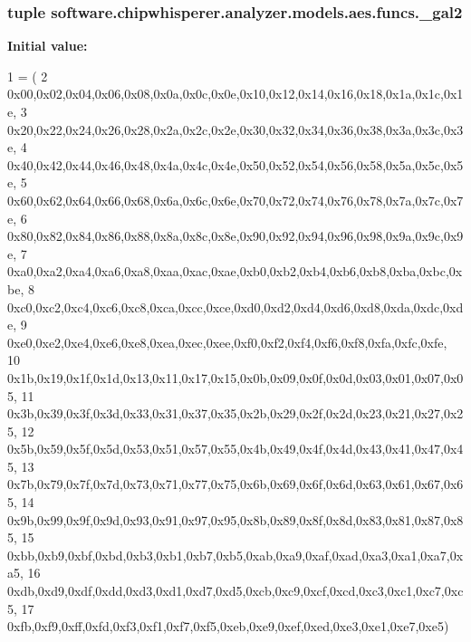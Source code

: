 \subsubsection[{\+\_\+gal2}]{\setlength{\rightskip}{0pt plus 5cm}tuple software.\+chipwhisperer.\+analyzer.\+models.\+aes.\+funcs.\+\_\+gal2}\label{namespacesoftware_1_1chipwhisperer_1_1analyzer_1_1models_1_1aes_1_1funcs_a72cff0a386d50150812d3de64c5efa8b}
{\bfseries Initial value\+:}
\begin{DoxyCode}
1 = (
2 0x00,0x02,0x04,0x06,0x08,0x0a,0x0c,0x0e,0x10,0x12,0x14,0x16,0x18,0x1a,0x1c,0x1e,
3 0x20,0x22,0x24,0x26,0x28,0x2a,0x2c,0x2e,0x30,0x32,0x34,0x36,0x38,0x3a,0x3c,0x3e,
4 0x40,0x42,0x44,0x46,0x48,0x4a,0x4c,0x4e,0x50,0x52,0x54,0x56,0x58,0x5a,0x5c,0x5e,
5 0x60,0x62,0x64,0x66,0x68,0x6a,0x6c,0x6e,0x70,0x72,0x74,0x76,0x78,0x7a,0x7c,0x7e,
6 0x80,0x82,0x84,0x86,0x88,0x8a,0x8c,0x8e,0x90,0x92,0x94,0x96,0x98,0x9a,0x9c,0x9e,
7 0xa0,0xa2,0xa4,0xa6,0xa8,0xaa,0xac,0xae,0xb0,0xb2,0xb4,0xb6,0xb8,0xba,0xbc,0xbe,
8 0xc0,0xc2,0xc4,0xc6,0xc8,0xca,0xcc,0xce,0xd0,0xd2,0xd4,0xd6,0xd8,0xda,0xdc,0xde,
9 0xe0,0xe2,0xe4,0xe6,0xe8,0xea,0xec,0xee,0xf0,0xf2,0xf4,0xf6,0xf8,0xfa,0xfc,0xfe,
10 0x1b,0x19,0x1f,0x1d,0x13,0x11,0x17,0x15,0x0b,0x09,0x0f,0x0d,0x03,0x01,0x07,0x05,
11 0x3b,0x39,0x3f,0x3d,0x33,0x31,0x37,0x35,0x2b,0x29,0x2f,0x2d,0x23,0x21,0x27,0x25,
12 0x5b,0x59,0x5f,0x5d,0x53,0x51,0x57,0x55,0x4b,0x49,0x4f,0x4d,0x43,0x41,0x47,0x45,
13 0x7b,0x79,0x7f,0x7d,0x73,0x71,0x77,0x75,0x6b,0x69,0x6f,0x6d,0x63,0x61,0x67,0x65,
14 0x9b,0x99,0x9f,0x9d,0x93,0x91,0x97,0x95,0x8b,0x89,0x8f,0x8d,0x83,0x81,0x87,0x85,
15 0xbb,0xb9,0xbf,0xbd,0xb3,0xb1,0xb7,0xb5,0xab,0xa9,0xaf,0xad,0xa3,0xa1,0xa7,0xa5,
16 0xdb,0xd9,0xdf,0xdd,0xd3,0xd1,0xd7,0xd5,0xcb,0xc9,0xcf,0xcd,0xc3,0xc1,0xc7,0xc5,
17 0xfb,0xf9,0xff,0xfd,0xf3,0xf1,0xf7,0xf5,0xeb,0xe9,0xef,0xed,0xe3,0xe1,0xe7,0xe5)
\end{DoxyCode}
\hypertarget{namespacesoftware_1_1chipwhisperer_1_1analyzer_1_1models_1_1aes_1_1funcs_aba18ee6f1cc18346b126e33d89a159bd}{}

